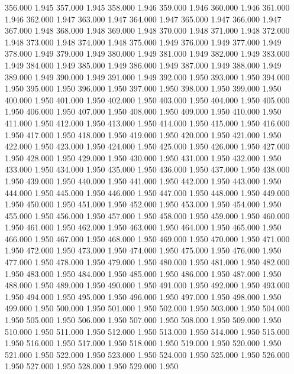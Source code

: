 356.000 1.945 
357.000 1.945 
358.000 1.946 
359.000 1.946 
360.000 1.946 
361.000 1.946 
362.000 1.947 
363.000 1.947 
364.000 1.947 
365.000 1.947 
366.000 1.947 
367.000 1.948 
368.000 1.948 
369.000 1.948 
370.000 1.948 
371.000 1.948 
372.000 1.948 
373.000 1.948 
374.000 1.948 
375.000 1.949 
376.000 1.949 
377.000 1.949 
378.000 1.949 
379.000 1.949 
380.000 1.949 
381.000 1.949 
382.000 1.949 
383.000 1.949 
384.000 1.949 
385.000 1.949 
386.000 1.949 
387.000 1.949 
388.000 1.949 
389.000 1.949 
390.000 1.949 
391.000 1.949 
392.000 1.950 
393.000 1.950 
394.000 1.950 
395.000 1.950 
396.000 1.950 
397.000 1.950 
398.000 1.950 
399.000 1.950 
400.000 1.950 
401.000 1.950 
402.000 1.950 
403.000 1.950 
404.000 1.950 
405.000 1.950 
406.000 1.950 
407.000 1.950 
408.000 1.950 
409.000 1.950 
410.000 1.950 
411.000 1.950 
412.000 1.950 
413.000 1.950 
414.000 1.950 
415.000 1.950 
416.000 1.950 
417.000 1.950 
418.000 1.950 
419.000 1.950 
420.000 1.950 
421.000 1.950 
422.000 1.950 
423.000 1.950 
424.000 1.950 
425.000 1.950 
426.000 1.950 
427.000 1.950 
428.000 1.950 
429.000 1.950 
430.000 1.950 
431.000 1.950 
432.000 1.950 
433.000 1.950 
434.000 1.950 
435.000 1.950 
436.000 1.950 
437.000 1.950 
438.000 1.950 
439.000 1.950 
440.000 1.950 
441.000 1.950 
442.000 1.950 
443.000 1.950 
444.000 1.950 
445.000 1.950 
446.000 1.950 
447.000 1.950 
448.000 1.950 
449.000 1.950 
450.000 1.950 
451.000 1.950 
452.000 1.950 
453.000 1.950 
454.000 1.950 
455.000 1.950 
456.000 1.950 
457.000 1.950 
458.000 1.950 
459.000 1.950 
460.000 1.950 
461.000 1.950 
462.000 1.950 
463.000 1.950 
464.000 1.950 
465.000 1.950 
466.000 1.950 
467.000 1.950 
468.000 1.950 
469.000 1.950 
470.000 1.950 
471.000 1.950 
472.000 1.950 
473.000 1.950 
474.000 1.950 
475.000 1.950 
476.000 1.950 
477.000 1.950 
478.000 1.950 
479.000 1.950 
480.000 1.950 
481.000 1.950 
482.000 1.950 
483.000 1.950 
484.000 1.950 
485.000 1.950 
486.000 1.950 
487.000 1.950 
488.000 1.950 
489.000 1.950 
490.000 1.950 
491.000 1.950 
492.000 1.950 
493.000 1.950 
494.000 1.950 
495.000 1.950 
496.000 1.950 
497.000 1.950 
498.000 1.950 
499.000 1.950 
500.000 1.950 
501.000 1.950 
502.000 1.950 
503.000 1.950 
504.000 1.950 
505.000 1.950 
506.000 1.950 
507.000 1.950 
508.000 1.950 
509.000 1.950 
510.000 1.950 
511.000 1.950 
512.000 1.950 
513.000 1.950 
514.000 1.950 
515.000 1.950 
516.000 1.950 
517.000 1.950 
518.000 1.950 
519.000 1.950 
520.000 1.950 
521.000 1.950 
522.000 1.950 
523.000 1.950 
524.000 1.950 
525.000 1.950 
526.000 1.950 
527.000 1.950 
528.000 1.950 
529.000 1.950 
